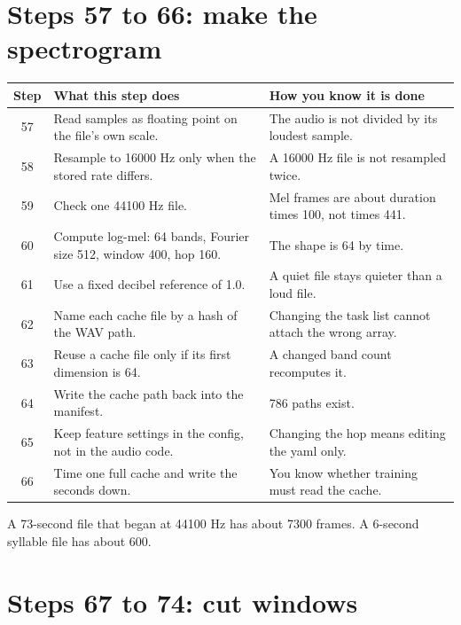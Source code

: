 \documentclass[11pt]{article}
\begin{document}
\section{Steps 57 to 66: make the spectrogram}

\begin{longtable}{cp{6.4cm}p{6.4cm}}
\toprule
Step & What this step does & How you know it is done \\
\midrule
\endhead
57 & Read samples as floating point on the file's own scale. & The audio is not divided by its loudest sample. \\
58 & Resample to 16000 Hz only when the stored rate differs. & A 16000 Hz file is not resampled twice. \\
59 & Check one 44100 Hz file. & Mel frames are about duration times 100, not times 441. \\
60 & Compute log-mel: 64 bands, Fourier size 512, window 400, hop 160. & The shape is 64 by time. \\
61 & Use a fixed decibel reference of 1.0. & A quiet file stays quieter than a loud file. \\
62 & Name each cache file by a hash of the WAV path. & Changing the task list cannot attach the wrong array. \\
63 & Reuse a cache file only if its first dimension is 64. & A changed band count recomputes it. \\
64 & Write the cache path back into the manifest. & 786 paths exist. \\
65 & Keep feature settings in the config, not in the audio code. & Changing the hop means editing the yaml only. \\
66 & Time one full cache and write the seconds down. & You know whether training must read the cache. \\
\bottomrule
\end{longtable}

A 73-second file that began at 44100 Hz has about 7300 frames. A 6-second syllable file has about 600.

\section{Steps 67 to 74: cut windows}
\end{document}
